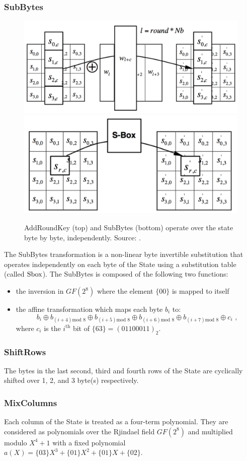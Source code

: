 \subsubsection*{SubBytes}
\begin{figure}
\centering
\includegraphics[width = .60\textwidth]{../Figures/FISP_AES/add_round_key.pdf} 
\includegraphics[width = .45\textwidth]{../Figures/FISP_AES/sbox.pdf} 
\caption[AddRoundKey and SubBytes.]{AddRoundKey (top) and SubBytes (bottom) operate over the state byte by byte, independently. Source: \cite{nist197}.}\label{fig:AES_sbox}
\end{figure}
The SubBytes transformation is a non-linear byte invertible substitution that operates independently on each byte of the State using a substitution table (called $\mathrm{Sbox}$). The SubBytes is composed of the following two functions:
\begin{itemize}
\item the inversion in $GF(2^8)$ where the element $\{00\}$ is mapped to itself
\item the affine transformation which maps each byte $b_i$ to:
\begin{equation}
b_i \oplus b_{(i+4)\mbox{mod }8} \oplus b_{(i+5)\mbox{mod }8} \oplus b_{(i+6)\mbox{mod }8} \oplus b_{(i+7)\mbox{mod }8} \oplus c_i \mbox{ ,}
\end{equation}
 where $c_i$ is the $i^\text{th}$ bit of $\{63\}  = (01100011)_2$.
\end{itemize}  
\subsubsection*{ShiftRows}
The bytes in the last second, third and fourth rows of the State are cyclically shifted over 1, 2, and 3 byte(s) respectively.
\subsubsection*{MixColumns}
Each column of the State is treated as a four-term polynomial. They are considered as polynomials over the Rjindael field $GF(2^8)$ and multiplied modulo $X^4 +1$ with a fixed polynomial $a(X) = \{03\}X^3 +\{01\}X^2 + \{01\}X + \{02\}$.

